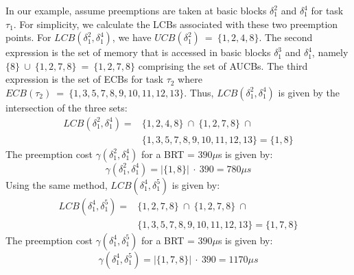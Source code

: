 \vspace{-10pt}
\newline
\noindent
In our example, assume preemptions are taken at basic blocks \begin{math}\delta_{1}^{2}\end{math} and \begin{math}\delta_{1}^{4}\end{math} for task \begin{math}\tau_{1}\end{math}. For simplicity, we calculate the LCBs associated with these two preemption points.  For $LCB(\delta_{1}^{2},\delta_{1}^{4})$, we have $UCB(\delta_{1}^{2})\ =\ \{1,2,4,8\}$.  The second expression is the set of memory that is accessed in basic blocks $\delta_{1}^{3}$ and $\delta_{1}^{4}$, namely $\{8\}\ \cup\ \{1,2,7,8\}\ =\ \{1,2,7,8\}$ comprising the set of AUCBs.  The third expression is the set of ECBs for task $\tau_{2}$ where $ECB(\tau_{2})\ =\ \{1,3,5,7,8,9,10,11,12,13\}$. Thus, $LCB(\delta_{1}^{2},\delta_{1}^{4})$ is given by the intersection of the three sets:
\begin{equation*}\label{eqn:lcb-example-1}
\begin{split}
    LCB(\delta_{1}^{2},\delta_{1}^{4}) = &\{1,2,4,8\}\ \cap\ \{1,2,7,8\}\ \cap\ \\&\{1,3,5,7,8,9,10,11,12,13\} = \{1,8\}
\end{split}
\end{equation*}
\newline
\noindent
The preemption cost $\gamma(\delta_{1}^{2},\delta_{1}^{4})$ for a BRT = $390\mu$s is given by:
\begin{equation*}\label{eqn:gamma-example-1}
    \gamma(\delta_{1}^{2},\delta_{1}^{4}) = |\{1,8\}|\ \cdot\ 390 = 780\mu\textit{s}
\end{equation*}
\newline
\noindent
Using the same method, $LCB(\delta_{1}^{4},\delta_{1}^{5})$ is given by:
\begin{equation*}\label{eqn:lcb-example-2}
\begin{split}
    LCB(\delta_{1}^{4},\delta_{1}^{5}) = &\{1,2,7,8\}\ \cap\ \{1,2,7,8\}\ \cap\ \\&\{1,3,5,7,8,9,10,11,12,13\} = \{1,7,8\}
\end{split}
\end{equation*}
\newline
\noindent
The preemption cost $\gamma(\delta_{1}^{4},\delta_{1}^{5})$ for a BRT = $390\mu$s is given by:
\begin{equation*}\label{eqn:gamma-example-1}
    \gamma(\delta_{1}^{4},\delta_{1}^{5}) = |\{1,7,8\}|\ \cdot\ 390 = 1170\mu\textit{s}
\end{equation*}

